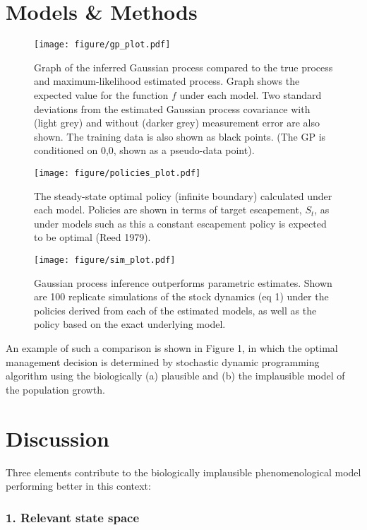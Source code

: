 \documentclass[author-year, review]{elsarticle} %
\makeatletter
\def\maxwidth{\ifdim\Gin@nat@width>\linewidth\linewidth
\else\Gin@nat@width\fi}
\let\Oldincludegraphics\includegraphics
\renewcommand{\includegraphics}[1]{\Oldincludegraphics[width=\maxwidth]{#1}}
\makeatother
\begin{document}
\section{Models \& Methods}

\begin{figure}[htbp]
\centering
\texttt{[image: figure/gp\_plot.pdf]}
\caption{Graph of the inferred Gaussian process compared to the true
process and maximum-likelihood estimated process. Graph shows the
expected value for the function $f$ under each model. Two standard
deviations from the estimated Gaussian process covariance with (light
grey) and without (darker grey) measurement error are also shown. The
training data is also shown as black points. (The GP is conditioned on
0,0, shown as a pseudo-data point).}
\end{figure}

\begin{figure}[htbp]
\centering
\texttt{[image: figure/policies\_plot.pdf]}
\caption{The steady-state optimal policy (infinite boundary) calculated
under each model. Policies are shown in terms of target escapement,
$S_t$, as under models such as this a constant escapement policy is
expected to be optimal (Reed 1979).}
\end{figure}

\begin{figure}[htbp]
\centering
\texttt{[image: figure/sim\_plot.pdf]}
\caption{Gaussian process inference outperforms parametric estimates.
Shown are 100 replicate simulations of the stock dynamics (eq 1) under
the policies derived from each of the estimated models, as well as the
policy based on the exact underlying model.}
\end{figure}

An example of such a comparison is shown in Figure 1, in which the
optimal management decision is determined by stochastic dynamic
programming algorithm using the biologically (a) plausible and (b) the
implausible model of the population growth.

\section{Discussion}

Three elements contribute to the biologically implausible
phenomenological model performing better in this context:

\subsubsection{1. Relevant state space}
\end{document}
